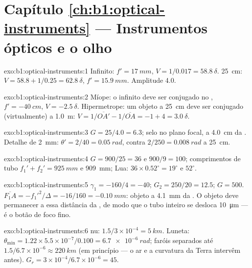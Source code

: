 \section*{Capítulo \ref{ch:b1:optical-instruments} --- Instrumentos ópticos e o olho}

\begin{solution}{exo:b1:optical-instruments:1}
Infinito: $f' = \qty{17}{mm}$, $V = 1/0.017 = \qty{58.8}{\delta}$.
\qty{25}{cm}: $V = 58.8 + 1/0.25 = \qty{62.8}{\delta}$, $f' = \qty{15.9}{mm}$.
Amplitude \qty{4.0}{\delta}.
\end{solution}

\begin{solution}{exo:b1:optical-instruments:2}
Míope: o infinito deve ser conjugado no , $f' = \qty{-40}{cm}$,
$V = \qty{-2.5}{\delta}$. Hipermetrope: um objeto a \qty{25}{cm} deve ser
conjugado (virtualmente) a \qty{1.0}{m}: $V = 1/\overline{OA'} - 1/\overline{OA}
= -1 + 4 = \qty{+3.0}{\delta}$.
\end{solution}

\begin{solution}{exo:b1:optical-instruments:3}
$G = 25/4.0 = 6.3$; selo no plano focal, a \qty{4.0}{cm} da
. Detalhe de \qty{2}{mm}: $\theta' = 2/40 = \qty{0.05}{rad}$, contra
$2/250 = \qty{0.008}{rad}$ a \qty{25}{cm}.
\end{solution}

\begin{solution}{exo:b1:optical-instruments:4}
$G = 900/25 = 36$ e $900/9 = 100$; comprimentos de tubo $f_1' + f_2' =
\qty{925}{mm}$ e \qty{909}{mm}; Lua: $36 \times 0.52^\circ = 19^\circ$
e $52^\circ$.
\end{solution}

\begin{solution}{exo:b1:optical-instruments:5}
$\gamma_1 = -160/4 = -40$; $G_2 = 250/20 = 12.5$; $G = 500$.
$\overline{F_1A} = -f_1'^2/\Delta = -16/160 = \qty{-0.10}{mm}$: objeto
a \qty{4.1}{mm} da . O objeto deve permanecer a essa distância
da , de modo que o tubo inteiro se desloca \qty{10}{\micro m} ---
é o botão de foco fino.
\end{solution}

\begin{solution}{exo:b1:optical-instruments:6}
 nu: $1.5/3\times10^{-4} = \qty{5}{km}$. Luneta: $\theta_{\min}
= 1.22 \times 5.5\times10^{-7}/0.100 = \qty{6.7e-6}{rad}$; faróis
separados até $1.5/6.7\times10^{-6} \approx \qty{220}{km}$ (em
princípio --- o ar e a curvatura da Terra intervêm antes). $G_r = 3\times10^{-4}/
6.7\times10^{-6} = 45$.
\end{solution}

